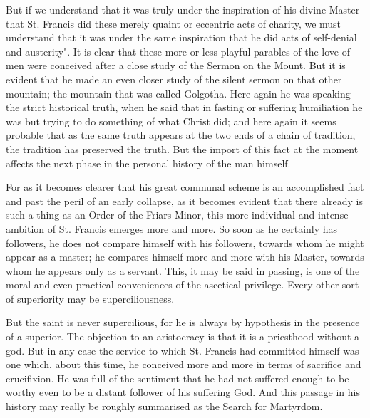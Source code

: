 \documentclass{book}
\begin{document}
But if we understand that it was truly under the inspiration of his divine Master that St. Francis did these merely quaint or eccentric acts of charity, we must understand that it was under the same inspiration that he did acts of self-denial and austerity". It is clear that these more or less playful parables of the love of men were conceived after a close study of the Sermon on the Mount. But it is evident that he made an even closer study of the silent sermon on that other mountain; the mountain that was called Golgotha. Here again he was speaking the strict historical truth, when he said that in fasting or suffering humiliation he was but trying to do something of what Christ did; and here again it seems probable that as the same truth appears at the two ends of a chain of tradition, the tradition has preserved the truth. But the import of this fact at the moment affects the next phase in the personal history of the man himself.

For as it becomes clearer that his great communal scheme is an accomplished fact and past the peril of an early collapse, as it becomes evident that there already is such a thing as an Order of the Friars Minor, this more individual and intense ambition of St. Francis emerges more and more. So soon as he certainly has followers, he does not compare himself with his followers, towards whom he might appear as a master; he compares himself more and more with his Master, towards whom he appears only as a servant. This, it may be said in passing, is one of the moral and even practical conveniences of the ascetical privilege. Every other sort of superiority may be superciliousness.

But the saint is never supercilious, for he is always by hypothesis in the presence of a superior. The objection to an aristocracy is that it is a priesthood without a god. But in any case the service to which St. Francis had committed himself was one which, about this time, he conceived more and more in terms of sacrifice and crucifixion. He was full of the sentiment that he had not suffered enough to be worthy even to be a distant follower of his suffering God. And this passage in his history may really be roughly summarised as the Search for Martyrdom.
\end{document}
